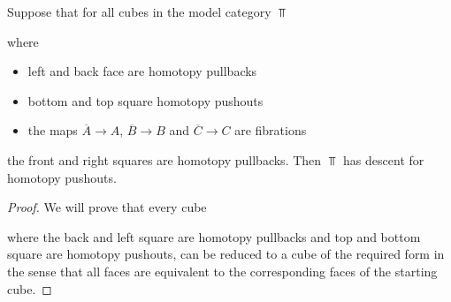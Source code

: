 \begin{lemma}\label{lem:reductionStepDescent}
    Suppose that for all cubes in the model category $\Top$
    \begin{center}
    \end{center}
    where 
    \begin{itemize}
        \item left and back face are homotopy pullbacks
        \item bottom and top square homotopy pushouts 
        \item the maps $\overline{A}\to A$, $\overline{B}\to B$ and $\overline{C}\to C$ are fibrations
    \end{itemize}
    the front and right squares are homotopy pullbacks.
    Then $\Top$ has descent for homotopy pushouts.
    \begin{proof}
        We will prove that every cube
        \begin{center}
        \end{center}
        where the back and left square are homotopy pullbacks and top and bottom square are homotopy pushouts, can be reduced to a cube of the required form in the sense that all faces are equivalent to the corresponding faces of the starting cube.
        

\end{proof}
\end{lemma}
